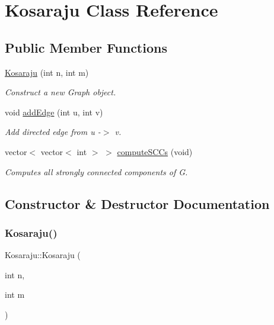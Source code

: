 \hypertarget{classKosaraju}{}\section{Kosaraju Class Reference}
\label{classKosaraju}
\subsection*{Public Member Functions}
\begin{DoxyCompactItemize}
\item 
\mbox{\hyperlink{classKosaraju_a0ef4ff4f55746c3a1a73a1209edfa148}{Kosaraju}} (int n, int m)
\begin{DoxyCompactList}\small\item\em Construct a new Graph object. \end{DoxyCompactList}\item 
void \mbox{\hyperlink{classKosaraju_a5823c2fbedc3a02653c78277138b9d55}{add\+Edge}} (int u, int v)
\begin{DoxyCompactList}\small\item\em Add directed edge from u -\/$>$ v. \end{DoxyCompactList}\item 
vector$<$ vector$<$ int $>$ $>$ \mbox{\hyperlink{classKosaraju_ae283595a4b00f90229ebb6a2f8a66f61}{compute\+S\+C\+Cs}} (void)
\begin{DoxyCompactList}\small\item\em Computes all strongly connected components of G. \end{DoxyCompactList}\end{DoxyCompactItemize}


\subsection{Constructor \& Destructor Documentation}
\mbox{\label{classKosaraju_a0ef4ff4f55746c3a1a73a1209edfa148}} 
\subsubsection{\texorpdfstring{Kosaraju()}{Kosaraju()}}
{\footnotesize\ttfamily Kosaraju\+::\+Kosaraju (\begin{DoxyParamCaption}\item[{int}]{n,  }\item[{int}]{m }\end{DoxyParamCaption})}



